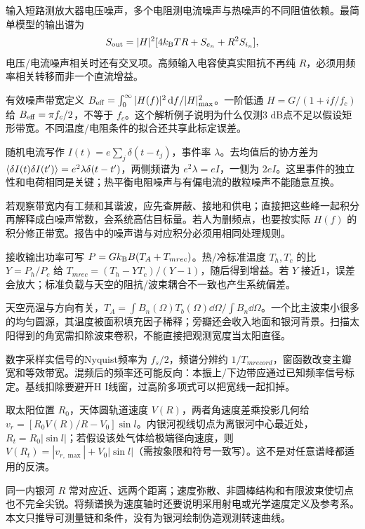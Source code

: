输入短路测放大器电压噪声，多个电阻测电流噪声与热噪声的不同阻值依赖。最简单模型的输出谱为
\[S_{\rm out}=|H|^2[4k_{\mathrm B} TR+S_{e_n}+R^2S_{i_n}],\]
电压/电流噪声相关时还有交叉项。高频输入电容使真实阻抗不再纯 $R$，必须用频率相关转移而非一个直流增益。

有效噪声带宽定义 $B_{\rm eff}=\int_0^\infty|H(f)|^2\,\mathrm d f/|H|_{\max}^2$。一阶低通 $H=G/(1+if/f_c)$ 给 $B_{\rm eff}=\pi f_c/2$，不等于 $f_c$。这个解析例子说明为什么仅测3 dB点不足以假设矩形带宽。不同温度/电阻条件的拟合还共享此标定误差。

随机电流写作 $I(t)=e\sum_j\delta(t-t_j)$，事件率 $\lambda$。去均值后的协方差为 $\langle \delta I(t)\delta I(t')\rangle=e^2\lambda\delta(t-t')$，两侧频谱为 $e^2\lambda=eI$，一侧为 $2eI$。这里事件的独立性和电荷相同是关键；热平衡电阻噪声与有偏电流的散粒噪声不能随意互换。

若观察带宽内有工频和其谐波，应先查屏蔽、接地和供电；直接把这些峰一起积分再解释成白噪声常数，会系统高估目标量。若人为删频点，也要按实际 $H(f)$ 的积分修正带宽。报告中的噪声谱与对应积分必须用相同处理规则。

接收输出功率可写 $P=Gk_{\mathrm B} B(T_A+T_{
m rec})$。热/冷标准温度 $T_h,T_c$ 的比 $Y=P_h/P_c$ 给 $T_{
m rec}=(T_h-YT_c)/(Y-1)$，随后得到增益。若 $Y$ 接近1，误差会放大；标准负载与天空的阻抗/波束耦合不一致也产生系统偏差。

天空亮温与方向有关，$T_A=\int B_n(\Omega)T_b(\Omega)\dd\Omega/\int B_n\dd\Omega$。一个比主波束小很多的均匀圆源，其温度被面积填充因子稀释；旁瓣还会收入地面和银河背景。扫描太阳得到的角宽需扣除波束卷积，不能直接把观测宽度当太阳直径。

数字采样实信号的Nyquist频率为 $f_s/2$，频谱分辨约 $1/T_{
m record}$，窗函数改变主瓣宽和等效带宽。混频后的频率还可能反向：本振上/下边带应通过已知频率信号标定。基线扣除要避开H I线窗，过高阶多项式可以把宽线一起扣掉。

取太阳位置 $R_0$，天体圆轨道速度 $V(R)$，两者角速度差乘投影几何给 $v_r=[R_0V(R)/R-V_0]\sin l$。内银河视线切点为离银河中心最近处，$R_t=R_0|\sin l|$；若假设该处气体给极端径向速度，则 $V(R_t)=|v_{r,\max}|+V_0|\sin l|$（需按象限和符号一致写）。这不是对任意谱峰都适用的反演。

同一内银河 $R$ 常对应近、远两个距离；速度弥散、非圆棒结构和有限波束使切点也不完全尖锐。将频谱换为速度轴时还要说明采用射电或光学速度定义及参考系。本文只推导可测量链和条件，没有为银河绘制伪造观测转速曲线。
